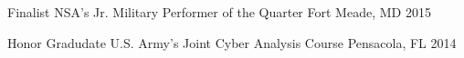 



\begin{cvhonors}

  \cvhonor
    {Finalist} %
    {NSA's Jr. Military Performer of the Quarter} %
    {Fort Meade, MD} %
    {2015} %

  \cvhonor
    {Honor Gradudate} %
    {U.S. Army's Joint Cyber Analysis Course} %
    {Pensacola, FL} %
    {2014} %

\end{cvhonors}
